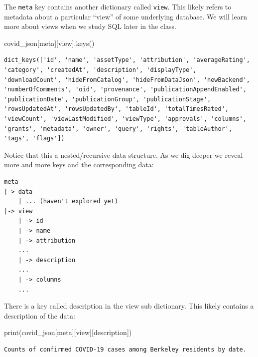 \documentclass[
  letterpaper,
  DIV=11,
  numbers=noendperiod]{scrreprt}
\newenvironment{Shaded}{\begin{snugshade}}{\end{snugshade}}
\newcommand{\BuiltInTok}[1]{\textcolor[rgb]{0.00,0.23,0.31}{#1}}
\newcommand{\NormalTok}[1]{\textcolor[rgb]{0.00,0.23,0.31}{#1}}
\newcommand{\StringTok}[1]{\textcolor[rgb]{0.13,0.47,0.30}{#1}}
\begin{document}
The \texttt{meta} key contains another dictionary called \texttt{view}.
This likely refers to metadata about a particular ``view'' of some
underlying database. We will learn more about views when we study SQL
later in the class.

\begin{Shaded}
\begin{Highlighting}[]
\NormalTok{covid\_json[}\StringTok{\textquotesingle{}meta\textquotesingle{}}\NormalTok{][}\StringTok{\textquotesingle{}view\textquotesingle{}}\NormalTok{].keys()}
\end{Highlighting}
\end{Shaded}

\begin{verbatim}
dict_keys(['id', 'name', 'assetType', 'attribution', 'averageRating', 'category', 'createdAt', 'description', 'displayType', 'downloadCount', 'hideFromCatalog', 'hideFromDataJson', 'newBackend', 'numberOfComments', 'oid', 'provenance', 'publicationAppendEnabled', 'publicationDate', 'publicationGroup', 'publicationStage', 'rowsUpdatedAt', 'rowsUpdatedBy', 'tableId', 'totalTimesRated', 'viewCount', 'viewLastModified', 'viewType', 'approvals', 'columns', 'grants', 'metadata', 'owner', 'query', 'rights', 'tableAuthor', 'tags', 'flags'])
\end{verbatim}

Notice that this a nested/recursive data structure. As we dig deeper we
reveal more and more keys and the corresponding data:

\begin{verbatim}
meta
|-> data
    | ... (haven't explored yet)
|-> view
    | -> id
    | -> name
    | -> attribution 
    ...
    | -> description
    ...
    | -> columns
    ...
\end{verbatim}

There is a key called description in the view sub dictionary. This
likely contains a description of the data:

\begin{Shaded}
\begin{Highlighting}[]
\BuiltInTok{print}\NormalTok{(covid\_json[}\StringTok{\textquotesingle{}meta\textquotesingle{}}\NormalTok{][}\StringTok{\textquotesingle{}view\textquotesingle{}}\NormalTok{][}\StringTok{\textquotesingle{}description\textquotesingle{}}\NormalTok{])}
\end{Highlighting}
\end{Shaded}

\begin{verbatim}
Counts of confirmed COVID-19 cases among Berkeley residents by date.
\end{verbatim}
\end{document}
